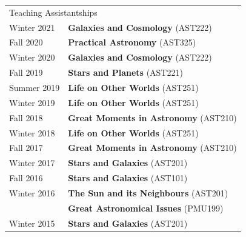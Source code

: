 \documentclass[10pt]{res} %
\begin{document}
\begin{resume}
\begin{table}[h!]
\begin{tabularx}{\textwidth}{ @{} p{6.5em} X @{} }
% 
% 
\multicolumn{2}{l}{ \rule{0pt}{3ex} \large \hspace{-12pt} Teaching Assistantships \dotfill \rule[-1.2ex]{0pt}{0pt}} \\
Winter 2021      & \textbf{Galaxies and Cosmology} (AST222) \\
Fall 2020      & \textbf{Practical Astronomy} (AST325) \\
Winter 2020  & \textbf{Galaxies and Cosmology} (AST222) \\
Fall 2019      & \textbf{Stars and Planets} (AST221) \\
Summer 2019 & \textbf{Life on Other Worlds} (AST251) \\
Winter 2019 & \textbf{Life on Other Worlds} (AST251) \\
Fall 2018      & \textbf{Great Moments in Astronomy} (AST210) \\
Winter 2018 & \textbf{Life on Other Worlds} (AST251) \\
Fall 2017      & \textbf{Great Moments in Astronomy} (AST210) \\
Winter 2017 & \textbf{Stars and Galaxies} (AST201) \\
Fall 2016 & \textbf{Stars and Galaxies} (AST101) \\
Winter 2016  & \textbf{The Sun and its Neighbours} (AST201) \\
                     & \textbf{Great Astronomical Issues} (PMU199) \\
Winter 2015 & \textbf{Stars and Galaxies} (AST201)
\end{tabularx}
\end{table}



\end{resume}
\end{document}
